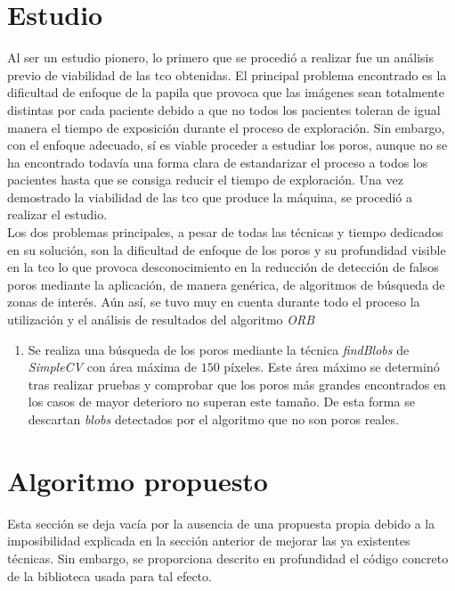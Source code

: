 \section{Estudio}
Al ser un estudio pionero, lo primero que se procedió a realizar fue
un análisis previo de viabilidad de las \gls{tco} obtenidas. El
principal problema encontrado es la dificultad de enfoque de la papila
que provoca que las imágenes sean totalmente distintas por cada
paciente debido a que no todos los pacientes toleran de igual manera
el tiempo de exposición durante el proceso de exploración. Sin
embargo, con el enfoque adecuado, sí es viable proceder a estudiar los
poros, aunque no se ha encontrado todavía una forma clara de
estandarizar el proceso a todos los pacientes hasta que se consiga
reducir el tiempo de exploración. Una vez demostrado la viabilidad de
las \gls{tco} que produce la máquina, se procedió a
realizar el estudio.\\
Los dos problemas principales, a pesar de todas las técnicas y tiempo
dedicados en su solución, son la dificultad de enfoque de los poros y
su profundidad visible en la \gls{tco} lo que provoca desconocimiento
en la reducción de detección de falsos poros mediante la aplicación,
de manera genérica, de algoritmos de búsqueda de zonas de
interés. Aún así, se tuvo muy en cuenta
durante todo el proceso la utilización y el análisis de resultados del
algoritmo \emph{\gls{ORB}~\citep*{orb-bib}}
\begin{enumerate}
\item Se realiza una búsqueda de los poros mediante la técnica
  \emph{findBlobs} de \emph{SimpleCV} con área máxima de $150$
  píxeles. Este área máximo se determinó tras realizar pruebas
  y comprobar que los poros más grandes encontrados en los casos
  de mayor deterioro no superan este tamaño. De esta forma se
  descartan \emph{blobs} detectados por el algoritmo que no son 
  poros reales.
\end{enumerate}

\section{Algoritmo propuesto}
Esta sección se deja vacía por la ausencia de una propuesta propia
debido a la imposibilidad explicada en la sección anterior de mejorar
las ya existentes técnicas. Sin embargo, se proporciona descrito en
profundidad el código concreto de la biblioteca usada para tal efecto.
